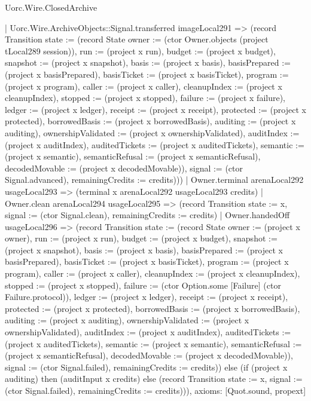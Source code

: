\begin{lexlean}{Uorc.Wire.ClosedArchive}
\begin{semanticmodule}
{      | Uorc.Wire.ArchiveObjects::Signal.transferred imageLocal291 => (record Transition {state := (record State {owner := (ctor Owner.objects (project tLocal289 session)), run := (project x run), budget := (project x budget), snapshot := (project x snapshot), basis := (project x basis), basisPrepared := (project x basisPrepared), basisTicket := (project x basisTicket), program := (project x program), caller := (project x caller), cleanupIndex := (project x cleanupIndex), stopped := (project x stopped), failure := (project x failure), ledger := (project x ledger), receipt := (project x receipt), protected := (project x protected), borrowedBasis := (project x borrowedBasis), auditing := (project x auditing), ownershipValidated := (project x ownershipValidated), auditIndex := (project x auditIndex), auditedTickets := (project x auditedTickets), semantic := (project x semantic), semanticRefusal := (project x semanticRefusal), decodedMovable := (project x decodedMovable)}), signal := (ctor Signal.advanced), remainingCredits := credits})))
    | Owner.terminal arenaLocal292 usageLocal293 => (terminal x arenaLocal292 usageLocal293 credits)
    | Owner.clean arenaLocal294 usageLocal295 => (record Transition {state := x, signal := (ctor Signal.clean), remainingCredits := credits})
    | Owner.handedOff usageLocal296 => (record Transition {state := (record State {owner := (project x owner), run := (project x run), budget := (project x budget), snapshot := (project x snapshot), basis := (project x basis), basisPrepared := (project x basisPrepared), basisTicket := (project x basisTicket), program := (project x program), caller := (project x caller), cleanupIndex := (project x cleanupIndex), stopped := (project x stopped), failure := (ctor Option.some [Failure] (ctor Failure.protocol)), ledger := (project x ledger), receipt := (project x receipt), protected := (project x protected), borrowedBasis := (project x borrowedBasis), auditing := (project x auditing), ownershipValidated := (project x ownershipValidated), auditIndex := (project x auditIndex), auditedTickets := (project x auditedTickets), semantic := (project x semantic), semanticRefusal := (project x semanticRefusal), decodedMovable := (project x decodedMovable)}), signal := (ctor Signal.failed), remainingCredits := credits})) else (if (project x auditing) then (auditInput x credits) else (record Transition {state := x, signal := (ctor Signal.failed), remainingCredits := credits}))),
  axioms: [Quot.sound, propext]
}


\end{semanticmodule}
\end{lexlean}
